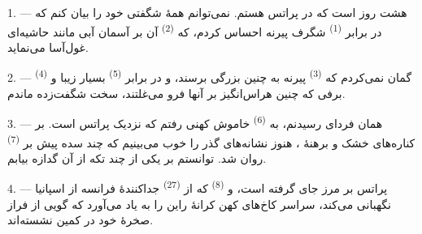 %

\VUsaut{4.0mm}
\VUsaut{3.0mm}

\VUsaut{3.0mm}
\VUsaut{3.0mm}

\VUsaut{3.0mm}
\VUsaut{3.0mm}

1. --- هشت روز است که در پراتس هستم. نمی‌توانم همهٔ شگفتی خود را بیان
کنم که در برابر  \textsuperscript{(1)} شگرف پیرنه
احساس کردم، که  \textsuperscript{(2)} آن بر آسمان آبی
مانند حاشیه‌ای غول‌آسا می‌نماید.

2. --- گمان نمی‌کردم که  \textsuperscript{(3)} پیرنه به
 چنین بزرگی برسند، و در برابر 
\textsuperscript{(5)} بسیار زیبا و 
\textsuperscript{(4)} برفی که  چنین هراس‌انگیز بر
آنها فرو می‌غلتند، سخت شگفت‌زده ماندم.

\VUsaut{3.0mm}
\VUsaut{3.0mm}

3. --- همان فردای رسیدنم، به  \textsuperscript{(6)}
خاموش کهنی رفتم که نزدیک پراتس است. بر کناره‌های خشک و برهنهٔ
، هنوز نشانه‌های گذر  را خوب می‌بینیم که
چند سده پیش بر  \textsuperscript{(7)} روان شد.
توانستم بر یکی از  چند تکه از آن گدازه بیابم.

4. --- پراتس بر مرز جای گرفته است، و  \textsuperscript{(8)}
که از  \textsuperscript{(27)} جداکنندهٔ فرانسه از
اسپانیا نگهبانی می‌کند، سراسر کاخ‌های کهن کرانهٔ راین را به یاد
می‌آورد که گویی از فراز صخرهٔ خود در کمین  نشسته‌اند.

